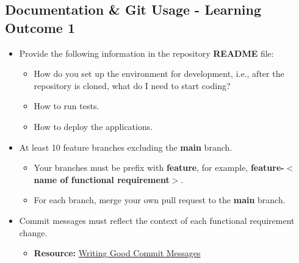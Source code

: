 \documentclass{article}
\begin{document}
\subsection*{Documentation \& Git Usage - Learning Outcome 1}
\begin{itemize}
    \item Provide the following information in the repository \textbf{README} file:
    \begin{itemize}
		\item How do you set up the environment for development, i.e., after the repository is cloned, what do I need to start coding?
		\item How to run tests.
		\item How to deploy the applications.
    \end{itemize}
    \item At least 10 feature branches excluding the \textbf{main} branch.
    \begin{itemize}
        \item Your branches must be prefix with \textbf{feature}, for example, \textbf{feature-$<$name of functional requirement$>$}.
        \item For each branch, merge your own pull request to the \textbf{main} branch.
    \end{itemize}
    \item Commit messages must reflect the context of each functional requirement change.
    \begin{itemize}
		\item \textbf{Resource:} \href{https://www.freecodecamp.org/news/writing-good-commit-messages-a-practical-guide}{Writing Good Commit Messages}
	\end{itemize}
\end{itemize}
\end{document}
